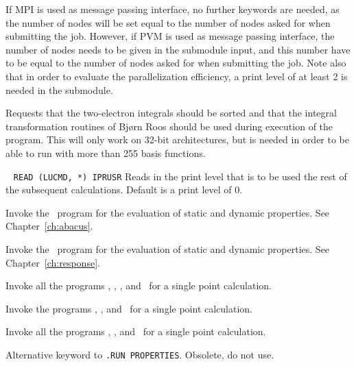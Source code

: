 \begin{description}
If MPI is used as message passing
interface, no further keywords are
needed, as the number of nodes will be set equal to the number of
nodes asked for when submitting the job. However, if PVM is used as
message passing interface, the number of nodes needs to be given in the
 submodule input, and this number have to be equal to
the number of nodes asked for when submitting the job. Note also that
in order to evaluate the parallelization efficiency, a print level of
at least 2 is needed in the  submodule.

\item[\Key{PRESORT}] Requests that the
two-electron integrals should be
sorted and that the integral transformation routines of Bj\o rn
Roos should be used during execution of the program. This will only
work on 32-bit architectures, but is needed in order to be able to run
with more than 255 basis functions.

\item[\Key{PRINT}]\verb| |\newline
\verb|READ (LUCMD, *) IPRUSR|
Reads in the print level that is to be used the rest of the subsequent
calculations. Default is a print level of 0.

\item[\Key{PROPERTIES}] Invoke the \aba\ program for the evaluation of static
and dynamic properties. See Chapter~\ref{ch:abacus}.

\item[\Key{RESPONSE}]

Invoke the \resp\ program for the evaluation of static and dynamic
properties. See Chapter~\ref{ch:response}.

\item[\Key{RUN ALL}]

Invoke all the programs \her , \sir , \resp , and \aba\ for a single point
     calculation.

\item[\Key{RUN PROPERTIES}]

Invoke the programs \her , \sir , and \aba\ for a single point
calculation.

\item[\Key{RUN RESPONSE}]

Invoke all the programs \her , \sir , and \resp\ for a single point
calculation.

\item[\Key{RUNABA}] Alternative keyword to \verb|.RUN PROPERTIES|. Obsolete, do not use.


\end{description}
